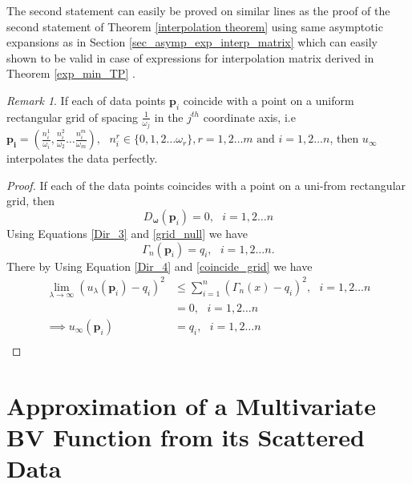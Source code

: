 \documentclass[multixcb]{amstext-l}
\theoremstyle{plain}
\theoremstyle{definition}
\theoremstyle{definition}
\theoremstyle{remark}
\newtheorem{remark}[theorem]{Remark}
\numberwithin{equation}{chapter}
\begin{document}
The second statement can easily be proved on similar lines as the proof of the second statement of Theorem \ref{interpolation theorem} using same asymptotic expansions as in Section \ref{sec_asymp_exp_interp_matrix} which can easily shown to be valid in case of expressions for interpolation matrix derived in Theorem \ref{exp_min_TP} .


\begin{remark}
If each of data points $\boldsymbol{p}_i$ coincide with a point on a uniform rectangular grid of spacing $\frac{1}{\omega_j}$ in the $j^{th}$ coordinate axis, i.e $\boldsymbol{p_i} = (\frac{n_i^1}{\omega_i},\frac{n_i^2}{\omega_2}\ldots \frac{n_i^m}{\omega_m}),\mbox{   }n_i^r\in\{0,1,2\ldots\omega_r\}, r= 1,2\ldots m \mbox{   and   } i = 1,2\ldots n$, then $u_{\infty}$ interpolates the data perfectly.
\end{remark}
\begin{proof}
If each of the data points coincides with a point on a uni-from rectangular grid, then \begin{equation}\label{grid_null}
    D_{\boldsymbol{\omega}}(\boldsymbol{p}_i) = 0, \mbox{    }i = 1,2\ldots n
\end{equation}
Using Equations \ref{Dir_3} and \ref{grid_null} we have
\begin{equation}\label{coincide_grid}
    \Gamma_n(\boldsymbol{p}_i) = q_i,\mbox{  } i = 1,2\ldots n.
\end{equation}
There by Using Equation \ref{Dir_4} and \ref{coincide_grid} we have
\begin{equation}\label{interp_grid}\begin{aligned}
    \lim\limits_{\lambda\to\infty}(u_{\lambda}(\boldsymbol{p}_i)-q_i)^2 &\le \sum_{i=1}^n(\Gamma_n(x)-q_i)^2,\mbox{     }i=1,2\ldots n\\
    &= 0,\mbox{     }i=1,2\ldots n\\
    \implies u_{\infty}(\boldsymbol{p}_i) &= q_i,\mbox{     }i=1,2\ldots n\\
    \end{aligned}
\end{equation}


\end{proof}










\chapter{Approximation of a Multivariate BV Function from its Scattered Data}\label{chap_4}
\end{document}
